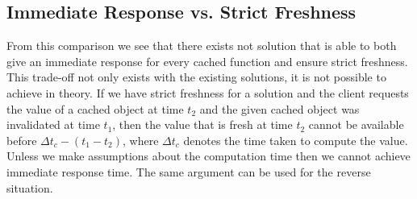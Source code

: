 \subsection{Immediate Response vs. Strict Freshness}
\label{subsec:immediate-response-vs-strict-freshness}

From this comparison we see that there exists not solution that is able to both give an immediate response for every cached function and ensure strict freshness. This trade-off not only exists with the existing solutions, it is not possible to achieve in theory.
If we have strict freshness for a solution and the client requests the value of a cached object at time $t_2$ and the given cached object was invalidated at time $t_1$, then the value that is fresh at time $t_2$ cannot be available before $\Delta t_c - (t_1 - t_2)$, where $\Delta t_c$ denotes the time taken to compute the value. Unless we make assumptions about the computation time then we cannot achieve immediate response time. The same argument can be used for the reverse situation.



